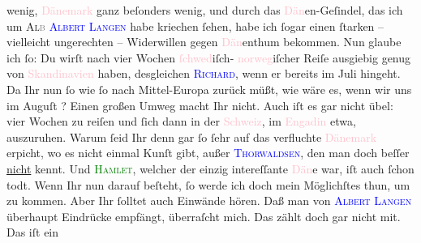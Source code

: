                wenig, \textcolor{pink}{Dänemark}{}\ledrightnote{\textcolor{pink}{Dänemark}} ganz beſonders wenig, {\pb}und durch das \textcolor{pink}{Dän}{}en-Geſindel, das ich um \textsc{Al\textcolor{gray}{b}}{ }\textsc{\textcolor{blue}{Albert Langen}{}\ledrightnote{\textcolor{blue}{Albert Langen}}} habe kriechen ſehen, habe ich ſogar einen ſtarken – vielleicht ungerechten –
               Widerwillen gegen \textcolor{pink}{Dän}{}enthum
               bekommen. Nun glaube ich  ſo: Du wirſt nach vier Wochen \textcolor{pink}{ſchwed}{}iſch- \textcolor{pink}{norweg}{}iſcher Reiſe ausgiebig genug von \textcolor{pink}{Skandinavien}{}\ledrightnote{\textcolor{pink}{Skandinavien}} haben, desgleichen \textsc{\textcolor{blue}{Richard}{}\ledrightnote{\textcolor{blue}{Richard Beer-Hofmann}}}, wenn er bereits im {\pb}Juli hingeht. Da Ihr nun ſo wie ſo nach Mittel-Europa
               zurück müßt, wie wäre es, wenn wir uns im Auguſt{ }\label{K_L02778-1v}\label{K_L02778-1h}? Einen großen Umweg macht Ihr nicht. Auch iſt es gar nicht übel: vier Wochen
               zu reiſen und ſich dann in der \textcolor{pink}{Schweiz}{}\ledrightnote{\textcolor{pink}{Schweiz}}, im \textcolor{pink}{Engadin}{}\ledrightnote{\textcolor{pink}{Engadin}}{ } etwa, auszuruhen. Warum ſeid Ihr denn {\pb}gar ſo
               ſehr auf das verfluchte \textcolor{pink}{Dänemark}{}\ledrightnote{\textcolor{pink}{Dänemark}}{ } erpicht, wo es nicht einmal Kunſt gibt,
               außer \textsc{\textcolor{blue}{Thorwaldsen}{}\ledrightnote{\textcolor{blue}{Bertel Thorvaldsen}}}, den man doch beſſer \uline{nicht} kennt. Und \textsc{\textcolor{green}{Hamlet}{}}, welcher der einzig intereſſante \textcolor{pink}{Dän}{}e war, iſt auch ſchon todt. Wenn Ihr nun darauf beſteht,
               ſo werde ich doch mein Möglichſtes thun, um zu kommen. Aber Ihr ſolltet auch Einwände
               hören.\pend
           \pstart
           {\pb}Daß man von \textsc{\textcolor{blue}{Albert Langen}{}\ledrightnote{\textcolor{blue}{Albert Langen}}} überhaupt  Eindrücke empfängt, überraſcht mich. Das zählt doch gar nicht mit. Das iſt ein
